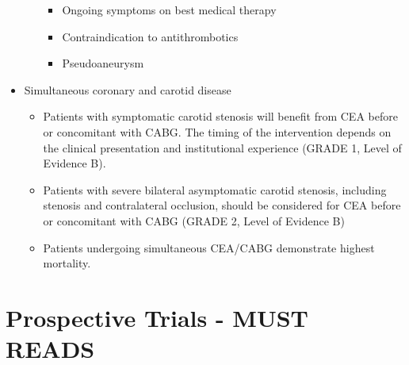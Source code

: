 \documentclass[
]{book}
\begin{document}
\begin{itemize}
\begin{itemize}
    \begin{itemize}
    \item
      Ongoing symptoms on best medical therapy
    \item
      Contraindication to antithrombotics
    \item
      Pseudoaneurysm
    \end{itemize}
  \end{itemize}
\item
  Simultaneous coronary and carotid disease

  \begin{itemize}
  \item
    Patients with symptomatic carotid stenosis will benefit from CEA
    before or concomitant with CABG. The timing of the intervention
    depends on the clinical presentation and institutional
    experience (GRADE 1, Level of Evidence B).
  \item
    Patients with severe bilateral asymptomatic carotid stenosis,
    including stenosis and contralateral occlusion, should be
    considered for CEA before or concomitant with CABG (GRADE 2,
    Level of Evidence B)
  \item
    Patients undergoing simultaneous CEA/CABG demonstrate highest
    mortality. \citep{naylorSystematicReviewOutcomes2003}
  \end{itemize}
\end{itemize}

\hypertarget{prospective-trials---must-reads}{%
\section{Prospective Trials - MUST READS}\label{prospective-trials---must-reads}}
\end{document}
